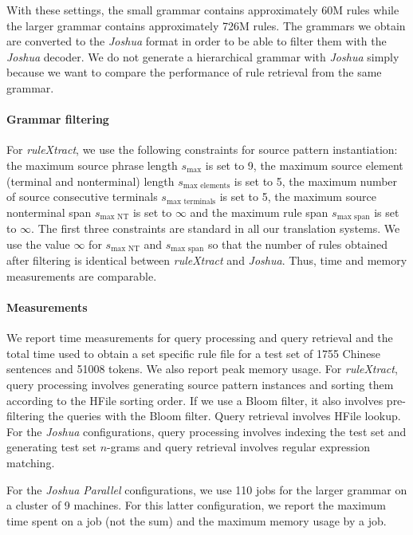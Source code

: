 With these settings, the small grammar contains approximately 60M rules while the 
larger grammar contains approximately 726M rules. The grammars we obtain are
converted to the \emph{Joshua} format in order to be able to filter them
with the \emph{Joshua} decoder. We do not generate a hierarchical grammar
with \emph{Joshua} simply because we want to compare the performance of
rule retrieval from the same grammar.
%
\paragraph{Grammar filtering} For \emph{ruleXtract}, we use the following constraints for
    source pattern instantiation: the maximum source phrase length $s_{\text{max}}$ is set to
    9, the maximum source element (terminal and nonterminal) length $s_{\text{max elements}}$
    is set to 5, the maximum number of source consecutive terminals $s_{\text{max terminals}}$
    is set to 5, the maximum source nonterminal span $s_{\text{max NT}}$ is set to $\infty$
    and the maximum rule span $s_{\text{max span}}$ is set to $\infty$. The first three
    constraints are standard in all our translation systems. We use the value $\infty$
    for $s_{\text{max NT}}$ and $s_{\text{max span}}$ so that the number of rules obtained after filtering is identical between
    \emph{ruleXtract} and \emph{Joshua}. Thus, time and memory measurements
    are comparable.
%
\paragraph{Measurements} We report time measurements for query processing and query
    retrieval and the total time used to obtain a set specific rule file for a
    test set of 1755 Chinese sentences and 51008 tokens. We also report peak
    memory usage. For \emph{ruleXtract}, query processing involves generating
    source pattern instances and sorting them according to the HFile sorting order.
    If we use a Bloom filter, it also involves pre-filtering the queries with
    the Bloom filter. Query retrieval involves HFile lookup. For the
    \emph{Joshua} configurations, query processing involves indexing the test
    set and generating test set $n$-grams and query retrieval involves regular
    expression matching.

    For the \emph{Joshua Parallel}
    configurations, we use 110 jobs for the larger grammar on a cluster of 9
    machines. For this latter configuration, we report the maximum time spent on
    a job (not the sum) and the maximum memory usage by a job.
%
